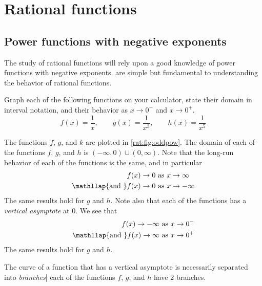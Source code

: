 \section{Rational functions}
\subsection*{Power functions with negative exponents}
The study of rational functions will rely upon a good knowledge 
of power functions with negative exponents.  are 
simple but fundamental to understanding the behavior of rational functions.
\begin{pccexample}\label{rat:ex:oddpow}
Graph each of the following functions on your calculator, state their domain in interval notation, and their 
behavior as $x\rightarrow 0^-$ and $x\rightarrow 0^+$.
\[
  f(x)=\frac{1}{x},\qquad g(x)=\dfrac{1}{x^3},\qquad h(x)=\dfrac{1}{x^5}
\]
\begin{pccsolution}
The functions $f$, $g$, and $k$ are plotted in \cref{rat:fig:oddpow}.
The domain of each of the functions $f$, $g$, and $h$ is $(-\infty,0)\cup (0,\infty)$. Note that 
the long-run behavior of each of the functions is the same, and in particular
\begin{align*}
    f(x)\rightarrow 0                         & \text{ as } x\rightarrow\infty\\
    \mathllap{\text{and }}  f(x)\rightarrow 0 & \text{ as } x\rightarrow-\infty
\end{align*}
The same results hold for $g$ and $h$. Note also that each of the functions
has a \emph{vertical asymptote} at $0$. We see that
\begin{align*}
    f(x)\rightarrow -\infty     & \text{ as } x\rightarrow 0^-\\
    \mathllap{\text{and }}   f(x)\rightarrow \infty &\text{ as } x\rightarrow 0^+
\end{align*}
The same results hold for $g$ and $h$.

The curve of a function that has a vertical asymptote is necessarily separated 
into \emph{branches}| each of the functions $f$, $g$, and $h$ have $2$ branches.
\end{pccsolution}
\end{pccexample}

